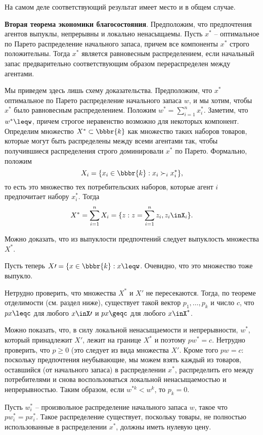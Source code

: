 На самом деле соответствующий результат имеет место и в общем случае.

{\bf Вторая теорема экономики благосостояния}. Предположим, что предпочтения агентов
выпуклы, непрерывны и локально ненасыщаемы. Пусть $x^*$ -- оптимальное по Парето
распределение начального запаса, причем все компоненты $x^*$ строго положительны.
Тогда $x^*$ является равновесным распределением, если начальный запас предварительно
соответствующим образом перераспределен между агентами.

Мы приведем здесь лишь схему доказательства. Предположим, что $x^*$ оптимальное по Парето
распределение начального запаса $w$, и мы хотим, чтобы $x^*$ было равновесным распределением.
Положим $w^*=\sum^n_{i=1}x^*_i$. Заметим, что $w^*\leqw$, причем строгое неравенство возможно
для некоторых компонент.
Определим множество $X^*\subset\bbbr{k}$ как множество таких наборов товаров, которые
могут быть распределены между всеми агентами так, чтобы получившиеся распределения
строго доминировали $x^*$ по Парето. Формально, положим
$$X_i=\{x_i\in\bbbr{k}: x_i\succ_ix^*_i\},$$
то есть это множество тех потребительских наборов, которые агент $i$ предпочитает
набору $x^*_i$. Тогда
$$X^*=\sum^n_{i=1}X_i=\{z: z=\sum^n_{i=1}z_i, z_i\inX_i\}.$$

Можно доказать, что из выпуклости предпочтений
следует выпуклость множества $X^*$.

Пусть теперь $X\prime=\{x\in\bbbr{k}: x\leqw$. Очевидно, что это множество тоже выпукло.

Нетрудно проверить, что множества $X^*$ и $X\prime$ не пересекаются. Тогда, по теореме отделимости
(см. раздел        ниже), существует такой вектор $p_1, \ldots , p_k$ и число $c$, что
$px\leqc$ для любого $x\inX\prime$ и $px\geqc$ для любого $x\inX^*$.

Можно показать, что, в силу локальной ненасыщаемости и непрерывности, $w^*$, который принадлежит
$X\prime$, лежит на границе $X^*$ и поэтому $pw^*=c$. Нетрудно проверить, что $p\geq0$ (это следует
из вида множества $X\prime$. Кроме того $pw=c$: поскольку предпочтения неубывающие, мы можем
взять каждый из товаров, оставшийся (от начального запаса) в распределении $x^*$, распределить
его между потребителями и снова воспользоваться локальной ненасыщаемостью и непрерывностью.
Таким образом, если $w^{*k}<w^k$, то $p_k=0$.

Пусть $w^*_i$ -- произвольное распределение начального запаса $w$, такое что
$pw^*_i=px^*_i$. Такое распределение существует, поскольку товары, не полностью
использованные в распределении $x^*$, должны иметь нулевую цену.


